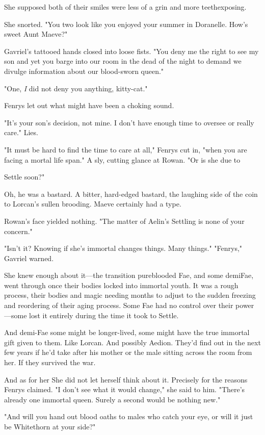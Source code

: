 She supposed both of their smiles were less of a grin and more 
teethexposing.

She snorted. "You two look like you enjoyed your summer in Doranelle. How's sweet Aunt Maeve?"

Gavriel's tattooed hands closed into loose fists. "You deny me the right to see my son and yet you barge into our room in the dead of the night to demand we divulge information about our blood-sworn queen."

"One, \emph{I} did not deny you anything, kitty-cat."

Fenrys let out what might have been a choking sound.

"It's your son's decision, not mine. I don't have enough time to oversee or really care." Lies.

"It must be hard to find the time to care at all," Fenrys cut in, "when you are facing a mortal life span." A sly, cutting glance at Rowan. "Or is she due to

Settle soon?"

Oh, he was a bastard. A bitter, hard-edged bastard, the laughing side of the coin to Lorcan's sullen brooding. Maeve certainly had a type.

Rowan's face yielded nothing. "The matter of Aelin's Settling is none of your concern."

"Isn't it? Knowing if she's immortal changes things. Many things." "Fenrys," Gavriel warned.

She knew enough about it---the transition pureblooded Fae, and some demiFae, went through once their bodies locked into immortal youth. It was a rough process, their bodies and magic needing months to adjust to the sudden freezing and reordering of their aging process. Some Fae had no control over their power ---some lost it entirely during the time it took to Settle.

And demi-Fae  some might be longer-lived, some might have the true immortal gift given to them. Like Lorcan. And possibly Aedion. They'd find out in the next few years if he'd take after his mother
 or the male sitting across the room from her. If they survived the war.

And as for her  She did not let herself think about it. Precisely for the reasons Fenrys claimed. "I don't see what it would change," she said to him. "There's already one immortal queen. Surely a second would be nothing new."

"And will you hand out blood oaths to males who catch your eye, or will it just be Whitethorn at your side?"

